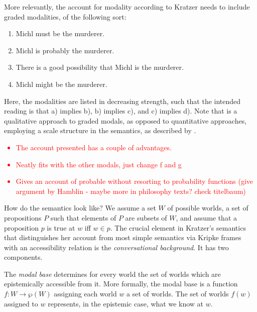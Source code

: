 \documentclass{article}
\theoremstyle{definition}
\newcommand\todo[1]{\textcolor{red}{#1}}
\begin{document}
More relevantly, the account for modality according to Kratzer needs to include graded modalities, of the following sort:
\begin{enumerate}[nosep,label=\alph*)]
  \item Michl must be the murderer.
  \item Michl is probably the murderer.
  \item There is a good possibility that Michl is the murderer.
  \item Michl might be the murderer.
\end{enumerate}
Here, the modalities are listed in decreasing strength, such that the intended reading is that a) implies b), b) implies c), and c) implies d).
Note that is a qualitative approach to graded modals, as opposed to quantitative approaches, employing a scale structure in the semantics, as described by \textcite{lassiter10_gradab}.

\todo{\begin{itemize}[nosep]
  \item The account presented has a couple of advantages.
\item Neatly fits with the other modals, just change f and g
\item Gives an account of probable without resorting to probability functions (give argument by Hamblin - maybe more in philosophy texts? check titelbaum)
\end{itemize}
}
How do the semantics look like?
We assume a set $W$ of possible worlds, a set of propositions $P$ such that elements of $P$ are subsets of $W$, and assume that a proposition $p$ is true at $w$ iff $w \in p$.
The crucial element in Kratzer's semantics that distinguishes her account from most simple semantics via Kripke frames with an accessibility relation is the \emph{conversational background}.
It has two components.

The \emph{modal base} determines for every world the set of worlds which are epistemically accessible from it.
More formally, the modal base is a function $f: W \rightarrow \wp(W)$ assigning each world $w$ a set of worlds.
The set of worlds $f(w)$ assigned to $w$ represents, in the epistemic case, what we know at $w$.
\end{document}

